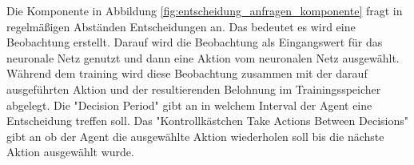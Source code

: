 Die Komponente in Abbildung \ref{fig:entscheidung_anfragen_komponente} fragt in regelmäßigen Abständen Entscheidungen an. Das bedeutet es wird eine Beobachtung erstellt. Darauf wird die Beobachtung als Eingangswert für das neuronale Netz genutzt und dann eine Aktion vom neuronalen Netz ausgewählt. Während dem training wird diese Beobachtung zusammen mit der darauf ausgeführten Aktion und der resultierenden Belohnung im Trainingsspeicher abgelegt. Die "Decision Period" gibt an in welchem Interval der Agent eine Entscheidung treffen soll. Das "Kontrollkästchen Take Actions Between Decisions" gibt an ob der Agent die ausgewählte Aktion wiederholen soll bis die nächste Aktion ausgewählt wurde.

